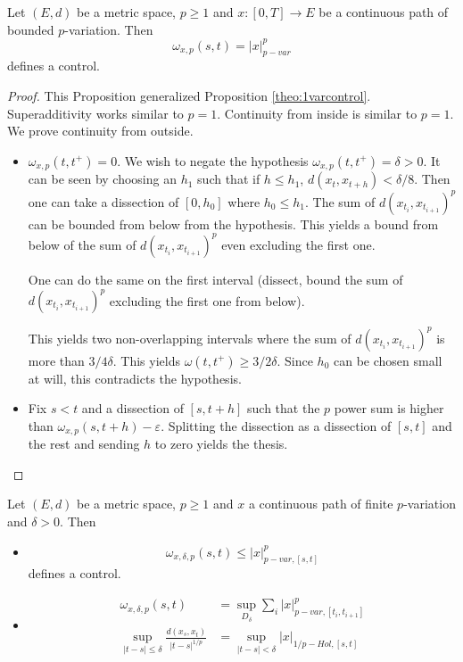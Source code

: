 \begin{proposition}
    Let $(E,d)$ be a metric space, $p \geq 1$ and $x: [0,T] \rightarrow E$ be a continuous path of bounded $p$-variation. Then
    \begin{equation}
        \omega_{x,p}(s,t) = |x|_{p-var}^p
    \end{equation}
    defines a control.
\end{proposition}
\begin{proof}
    This Proposition generalized Proposition \ref{theo:1varcontrol}.
    Superadditivity works similar to $p=1$.
    Continuity from inside is similar to $p=1$.
    We prove continuity from outside.
    \begin{itemize}
        \item $\omega_{x,p}(t,t^+) = 0$.
        We wish to negate the hypothesis $\omega_{x,p}(t,t^+) = \delta > 0$.
        It can be seen by choosing an $h_1$ such that if $h \leq h_1$, $d(x_t,x_{t+h}) < \delta / 8.$
        Then one can take a dissection of $[0,h_0]$ where $h_0 \leq h_1$.
        The sum of $d(x_{t_i},x_{t_{i+1}})^p$ can be bounded from below from the hypothesis.
        This yields a bound from below of the sum of $d(x_{t_i},x_{t_{i+1}})^p$ even excluding the first one.
        
        One can do the same on the first interval (dissect, bound the sum of $d(x_{t_i},x_{t_{i+1}})^p$ excluding the first one from below).

        This yields two non-overlapping intervals where the sum of $d(x_{t_i},x_{t_{i+1}})^p$ is more than $3/4 \delta.$ This yields $\omega(t, t^+) \geq 3/2 \delta.$ Since $h_0$ can be chosen small at will, this contradicts the hypothesis.
        \item Fix $s < t$ and a dissection of $[s,t+h]$ such that the $p$ power sum is higher than $\omega_{x,p}(s,t+h) - \varepsilon.$ Splitting the dissection as a dissection of $[s,t]$ and the rest and sending $h$ to zero yields the thesis.
    \end{itemize}
\end{proof}

\begin{proposition}
    Let $(E,d)$ be a metric space, $p \geq 1$ and $x$ a continuous path of finite $p$-variation and $\delta > 0.$ Then
    \begin{itemize}
        \item \begin{equation}
            \omega_{x,\delta,p}(s,t) \leq |x|_{p-var,[s,t]}^p
        \end{equation}
        defines a control.
        \item \begin{align}
            \omega_{x,\delta,p}(s,t) &= \sup_{D_\delta} \sum_i |x|_{p-var,[t_i,t_{i+1}]}^p \\
            \sup_{|t - s| \leq \delta} \frac{d(x_s, x_t)}{|t - s|^{1/p}} &= \sup_{|t - s| < \delta} |x|_{1/p-Hol, [s,t]}
        \end{align}
    \end{itemize}
\end{proposition}

